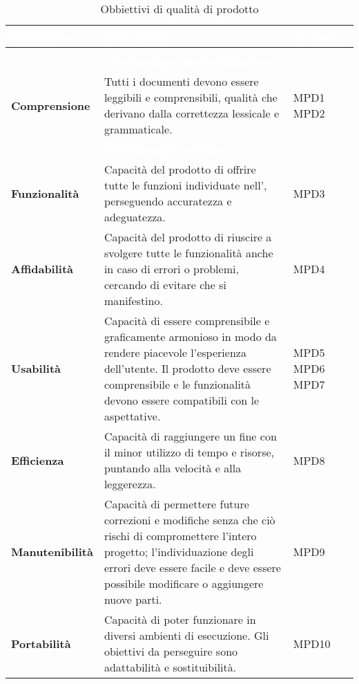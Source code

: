 {
\setlength\arrayrulewidth{0.95pt}
\renewcommand{\arraystretch}{1.5}
\begin{longtable}{C{3cm} | C{9.5cm} | C{2.5cm}}

\textcolor{white}{\textbf{Obbiettivo}}&
\textcolor{white}{\textbf{Descrizione}}&
\textcolor{white}{\textbf{Metriche}} \\
\endfirsthead
{}\\
\endfoot
{}\caption{Obbiettivi di qualità di prodotto}
\endlastfoot
	
 & \textcolor{white}{\textbf{Monitoraggio documentazione}} &  \\

	\textbf{Comprensione} &
	 Tutti i documenti devono essere leggibili e comprensibili, qualità che derivano dalla correttezza lessicale e grammaticale. &
	MPD1 \newline MPD2 \\
 
 & \textcolor{white}{\textbf{Monitoraggio software}} &  \\
 
	\textbf{Funzionalità} & 
	Capacità del prodotto di offrire tutte le funzioni individuate nell'\AdRv{}, perseguendo accuratezza e adeguatezza. &
	MPD3 \\
	
	\textbf{Affidabilità} &
	 Capacità del prodotto di riuscire a svolgere tutte le funzionalità anche in caso di errori o problemi, cercando di evitare che si manifestino. &
	MPD4 \\
	
	\textbf{Usabilità} &
	Capacità di essere comprensibile e graficamente armonioso in modo da rendere piacevole l'esperienza dell'utente. Il prodotto deve essere comprensibile e le funzionalità devono essere compatibili con le aspettative. &
    MPD5 \newline MPD6 \newline MPD7 \\
    
	\textbf{Efficienza} & 
	Capacità di raggiungere un fine con il minor utilizzo di tempo e risorse, puntando alla velocità e alla leggerezza. &
	MPD8 \\
	
	\textbf{Manutenibilità} & 
	Capacità di permettere future correzioni e modifiche senza che ciò rischi di compromettere l'intero progetto; l'individuazione degli errori deve essere facile e deve essere possibile modificare o aggiungere nuove parti. &
 	MPD9 \\
 	
	\textbf{Portabilità} & 
	Capacità di poter funzionare in diversi ambienti di esecuzione. Gli obiettivi da perseguire sono adattabilità e sostituibilità. &
	MPD10 \\
	
\end{longtable}	

}

